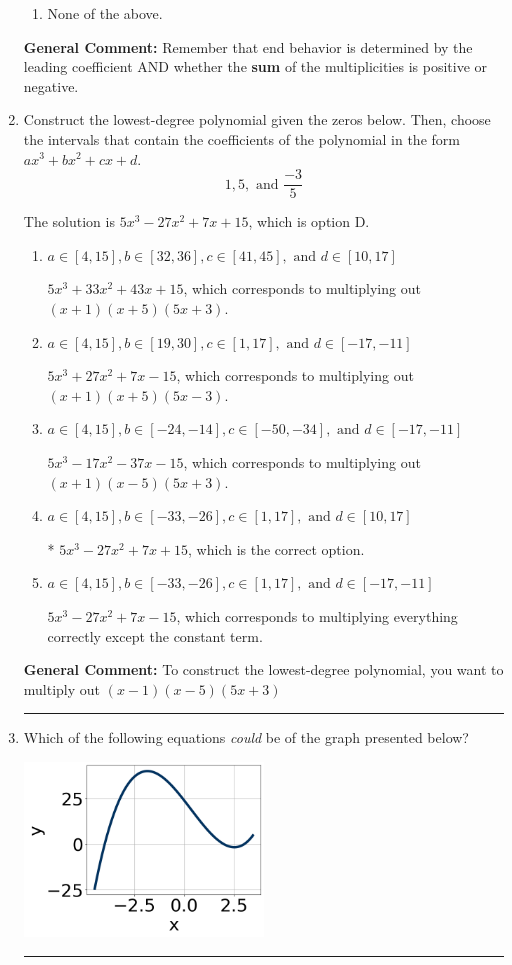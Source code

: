 \documentclass{extbook}[14pt]
\newcommand{\litem}[1]{\item #1

\rule{\textwidth}{0.4pt}}
\begin{document}
\begin{enumerate}
{\begin{enumerate}[label=\Alph*.]
\begin{multicols}{2}
\end{multicols}\item None of the above.\end{enumerate}
\textbf{General Comment:} Remember that end behavior is determined by the leading coefficient AND whether the \textbf{sum} of the multiplicities is positive or negative.
}
\litem{
Construct the lowest-degree polynomial given the zeros below. Then, choose the intervals that contain the coefficients of the polynomial in the form $ax^3+bx^2+cx+d$.
\[ 1, 5, \text{ and } \frac{-3}{5} \]

The solution is \( 5x^{3} -27 x^{2} +7 x + 15 \), which is option D.\begin{enumerate}[label=\Alph*.]
\item \( a \in [4, 15], b \in [32, 36], c \in [41, 45], \text{ and } d \in [10, 17] \)

$5x^{3} +33 x^{2} +43 x + 15$, which corresponds to multiplying out $(x + 1)(x + 5)(5x + 3)$.
\item \( a \in [4, 15], b \in [19, 30], c \in [1, 17], \text{ and } d \in [-17, -11] \)

$5x^{3} +27 x^{2} +7 x -15$, which corresponds to multiplying out $(x + 1)(x + 5)(5x -3)$.
\item \( a \in [4, 15], b \in [-24, -14], c \in [-50, -34], \text{ and } d \in [-17, -11] \)

$5x^{3} -17 x^{2} -37 x -15$, which corresponds to multiplying out $(x + 1)(x -5)(5x + 3)$.
\item \( a \in [4, 15], b \in [-33, -26], c \in [1, 17], \text{ and } d \in [10, 17] \)

* $5x^{3} -27 x^{2} +7 x + 15$, which is the correct option.
\item \( a \in [4, 15], b \in [-33, -26], c \in [1, 17], \text{ and } d \in [-17, -11] \)

$5x^{3} -27 x^{2} +7 x -15$, which corresponds to multiplying everything correctly except the constant term.
\end{enumerate}

\textbf{General Comment:} To construct the lowest-degree polynomial, you want to multiply out $(x -1)(x -5)(5x + 3)$
}
\litem{
Which of the following equations \textit{could} be of the graph presented below?

\begin{center}
    \includegraphics[width=0.5\textwidth]{../Figures/polyGraphToFunctionCopyA.png}
\end{center}




}
\end{enumerate}
\end{document}
